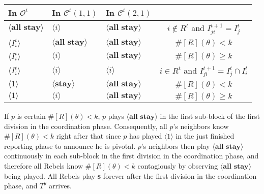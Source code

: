 \documentclass[12pt,letter]{article}
\newcommand{\Kappa}{\mathcal{C}}
\newcommand{\Omicron}{\mathcal{O}}
\theoremstyle{definition}
\theoremstyle{remark}
\theoremstyle{claim}
\begin{document}
\begin{table}[!htbp]
\begin{center}
\begin{tabular}{l l l | c}
\hline
\hline
In $\Omicron^t$			&	In $\Kappa^t(1,1)$			&			In $\Kappa^t(2,1)$		&   \\
\hline
$\langle \textbf{all stay} \rangle$  & $\langle i \rangle$	&  $\langle \textbf{all stay} \rangle$ &  $i\notin R^t$ and $I^{t+1}_{ji}=I^t_j$  \\
$\langle I^t_{i} \rangle$  & $\langle \textbf{all stay} \rangle$	&  $\langle \textbf{all stay} \rangle$ &  $\#[R](\theta)< k$ \\
$\langle I^t_{i} \rangle$  & $\langle i \rangle$	&  $\langle \textbf{all stay} \rangle$ &  $\#[R](\theta)\geq k$ \\
$\langle I^t_{i} \rangle$  & $\langle i \rangle$	&  $\langle i \rangle$ &  $i\in R^t$ and $I^{t+1}_{ji}=I^t_j\cap I^t_{i}$ \\
$\langle 1 \rangle$  & $\langle \textbf{stay} \rangle$	&	$\langle \textbf{all stay} \rangle$ &  $\#[R](\theta)< k$    \\
$\langle 1 \rangle$  & $\langle i \rangle$	&	$\langle \textbf{all stay} \rangle$ &  $\#[R](\theta)\geq k$  \\
  \hline
\end{tabular}
\end{center}
\end{table}


If $p$ is certain $\#[R](\theta)< k$, $p$ plays $\langle \textbf{all stay} \rangle$ in the first sub-block of the first division in the coordination phase. Consequently, all $p$'s neighbors know $\#[R](\theta)< k$ right after that since $p$ has played $\langle 1 \rangle$ in the just finished reporting phase to announce he is pivotal. $p$'s neighbors then play $\langle \textbf{all stay} \rangle$ continuously in each sub-block in the first division in the coordination phase, and therefore all Rebels know $\#[R](\theta)< k$ contagiously by observing $\langle \textbf{all stay} \rangle$ being played. All Rebels play \textbf{s} forever after the first division in the coordination phase, and $T^{\theta}$ arrives. 
\end{document}
